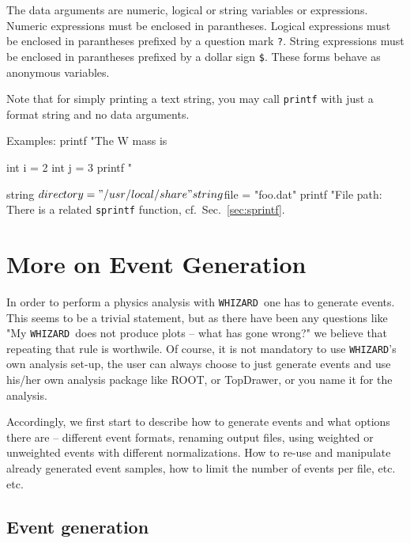 \documentclass[12pt]{book}
\newenvironment{code}%
  {\begingroup\footnotesize
   \quote
   \verbatim}%
  {\endverbatim
   \endquote
   \endgroup\noindent}
\newcommand{\ttt}[1]{\texttt{#1}}
\newcommand{\whizard}{\texttt{WHIZARD}}
\begin{document}
The data arguments are numeric, logical or string variables or expressions.
Numeric expressions must be enclosed in parantheses.  Logical expressions must
be enclosed in parantheses prefixed by a question mark \verb|?|.  String
expressions must be enclosed in parantheses prefixed by a dollar sign
\verb|$|.  These forms behave as anonymous variables.

Note that for simply printing a text string, you may call \ttt{printf} with
just a format string and no data arguments.

Examples:
\begin{code}
printf "The W mass is %

int i = 2
int j = 3
printf "%

string $directory = "/usr/local/share"
string $file = "foo.dat"
printf "File path: %
\end{code}
There is a related \ttt{sprintf} function, cf.~Sec.~\ref{sec:sprintf}.



\chapter{More on Event Generation}
\label{sec:events}

In order to perform a physics analysis with \whizard\ one has to
generate events. This seems to be a trivial statement, but as there
have been any questions like "My \whizard\ does not produce plots --
what has gone wrong?" we believe that repeating that rule is
worthwile. Of course, it is not mandatory to use \whizard's own analysis
set-up, the user can always choose to just generate events and use
his/her own analysis package like ROOT, or TopDrawer, or you name it
for the analysis. 

Accordingly, we first start to describe how to generate events and
what options there are -- different event formats, renaming output
files, using weighted or unweighted events with different
normalizations. How to re-use and manipulate already generated event
samples, how to limit the number of events per file, etc. etc.

\section{Event generation}
\end{document}
